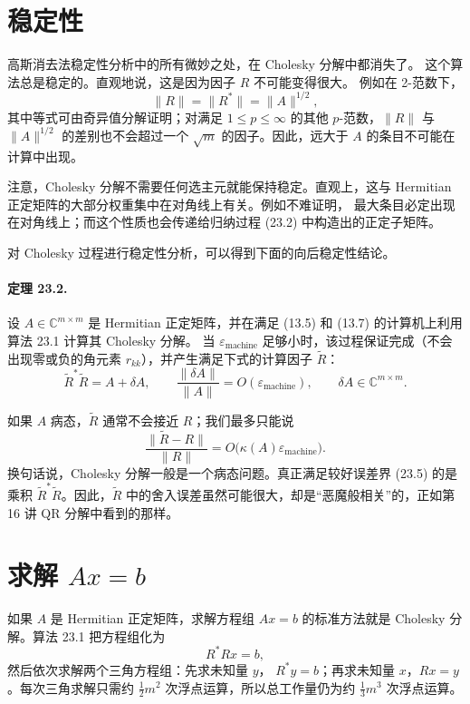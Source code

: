 \documentclass[UTF8,fontset=none,12pt]{ctexart}
\newcommand{\epsmach}{\varepsilon_{\mathrm{machine}}}
\begin{document}
\section*{稳定性}

高斯消去法稳定性分析中的所有微妙之处，在 Cholesky 分解中都消失了。
这个算法总是稳定的。直观地说，这是因为因子 $R$ 不可能变得很大。
例如在 2-范数下，
\[
\|R\|=\|R^*\|=\|A\|^{1/2},
\]
其中等式可由奇异值分解证明；对满足 $1\le p\le\infty$ 的其他
$p$-范数，$\|R\|$ 与 $\|A\|^{1/2}$ 的差别也不会超过一个
$\sqrt m$ 的因子。因此，远大于 $A$ 的条目不可能在计算中出现。

注意，Cholesky 分解不需要任何选主元就能保持稳定。直观上，这与
Hermitian 正定矩阵的大部分权重集中在对角线上有关。例如不难证明，
最大条目必定出现在对角线上；而这个性质也会传递给归纳过程 (23.2)
中构造出的正定子矩阵。

对 Cholesky 过程进行稳定性分析，可以得到下面的向后稳定性结论。

\paragraph{定理 23.2.}
设 $A\in\mathbb{C}^{m\times m}$ 是 Hermitian 正定矩阵，并在满足
(13.5) 和 (13.7) 的计算机上利用算法 23.1 计算其 Cholesky 分解。
当 $\epsmach$ 足够小时，该过程保证完成（不会出现零或负的角元素
$r_{kk}$），并产生满足下式的计算因子 $\widetilde R$：
\begin{equation}
\widetilde R^*\widetilde R=A+\delta A,\qquad
\frac{\|\delta A\|}{\|A\|}=O(\epsmach),
\qquad \delta A\in\mathbb{C}^{m\times m}.
\tag{23.5}
\end{equation}

如果 $A$ 病态，$\widetilde R$ 通常不会接近 $R$；我们最多只能说
\[
\frac{\|\widetilde R-R\|}{\|R\|}
=O\bigl(\kappa(A)\epsmach\bigr).
\]
换句话说，Cholesky 分解一般是一个病态问题。真正满足较好误差界
(23.5) 的是乘积 $\widetilde R^*\widetilde R$。因此，$\widetilde R$
中的舍入误差虽然可能很大，却是“恶魔般相关”的，正如第 16 讲
QR 分解中看到的那样。

\section*{求解 $Ax=b$}

如果 $A$ 是 Hermitian 正定矩阵，求解方程组 $Ax=b$ 的标准方法就是
Cholesky 分解。算法 23.1 把方程组化为
\[
R^*Rx=b,
\]
然后依次求解两个三角方程组：先求未知量 $y$，
$R^*y=b$；再求未知量 $x$，$Rx=y$。每次三角求解只需约
$\frac12m^2$ 次浮点运算，所以总工作量仍为约
$\frac13m^3$ 次浮点运算。
\end{document}
